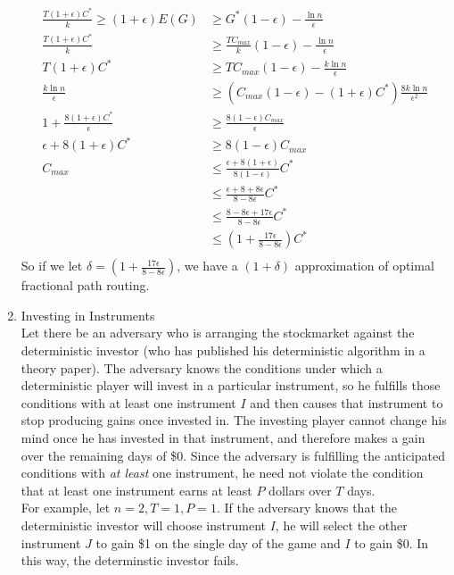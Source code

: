 \documentclass[a4paper]{article}
\begin{document}
\begin{enumerate}
\begin{align*}
		\frac{T(1+\epsilon)C^*}{k} \geq (1+\epsilon) E(G) &\geq G^*(1-\epsilon)- \frac{\ln n}{\epsilon} \\
		\frac{T(1+\epsilon)C^*}{k} &\geq \frac{TC_{max}}{k}(1-\epsilon) - \frac{\ln n}{\epsilon} \\
		T(1+\epsilon)C^* &\geq TC_{max} (1-\epsilon) - \frac{k \ln n}{\epsilon} \\
		\frac{k \ln n}{\epsilon} &\geq (C_{max}(1-\epsilon) - (1+\epsilon)C^*)\frac{8k \ln n} {\epsilon ^2} \\
		1 + \frac{8(1+\epsilon )C^*}{\epsilon} &\geq \frac{8(1-\epsilon)C_{max}}{\epsilon} \\
		\epsilon + 8(1+ \epsilon)C^* &\geq 8(1-\epsilon)C_{max} \\
		C_{max} &\leq \frac{\epsilon + 8 (1 + \epsilon)}{8(1-\epsilon)}C^* \\
		&\leq \frac{\epsilon + 8 + 8\epsilon}{8-8\epsilon}C^* \\
		&\leq \frac{8 - 8\epsilon + 17\epsilon}{8-8\epsilon}C^* \\
		&\leq (1 + \frac{17\epsilon}{8-8\epsilon})C^* \\
	\end{align*}
So if we let $\delta = (1 + \frac{17\epsilon}{8-8\epsilon})$, we have a $(1+ \delta)$ approximation of optimal fractional path routing.
\item Investing in Instruments \\
Let there be an adversary who is arranging the stockmarket against the deterministic investor (who has published his deterministic algorithm in a theory paper).  The adversary knows the conditions under which a deterministic player will invest in a particular instrument, so he fulfills those conditions with at least one instrument $I$ and then causes that instrument to stop producing gains once invested in.  The investing player cannot change his mind once he has invested in that instrument, and therefore makes a gain over the remaining days of \$0.  Since the adversary is fulfilling the anticipated conditions with \emph{at least} one instrument, he need not violate the condition that at least one instrument earns at least $P$ dollars over $T$ days.\\
For example, let $n=2,T=1,P=1$.  If the adversary knows that the deterministic investor will choose instrument $I$, he will select the other instrument $J$ to gain \$1 on the single day of the game and $I$ to gain \$0.  In this way, the determinstic investor fails.
\end{enumerate}
\end{document}
